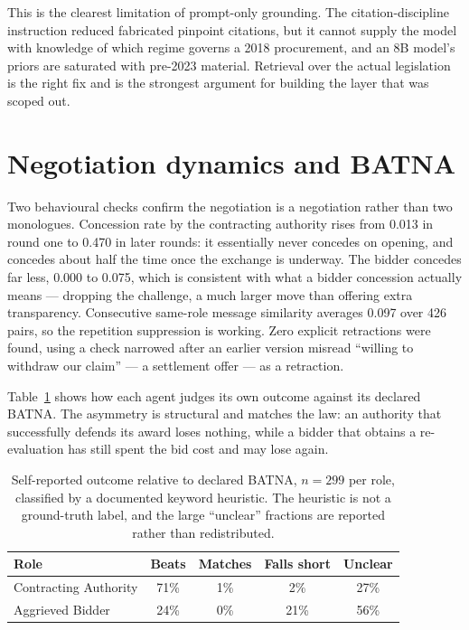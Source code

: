 This is the clearest limitation of prompt-only grounding. The citation-discipline
instruction reduced fabricated pinpoint citations, but it cannot supply the model
with knowledge of which regime governs a 2018 procurement, and an 8B model's
priors are saturated with pre-2023 material. Retrieval over the actual legislation
is the right fix and is the strongest argument for building the layer that was
scoped out.

\section{Negotiation dynamics and BATNA}
\label{sec:dynamics}

Two behavioural checks confirm the negotiation is a negotiation rather than two
monologues. Concession rate by the contracting authority rises from 0.013 in round
one to 0.470 in later rounds: it essentially never concedes on opening, and
concedes about half the time once the exchange is underway. The bidder concedes
far less, 0.000 to 0.075, which is consistent with what a bidder concession
actually means --- dropping the challenge, a much larger move than offering extra
transparency. Consecutive same-role message similarity averages 0.097 over 426
pairs, so the repetition suppression is working. Zero explicit retractions were
found, using a check narrowed after an earlier version misread ``willing to
withdraw our claim'' --- a settlement offer --- as a retraction.

Table~\ref{tab:batna} shows how each agent judges its own outcome against its
declared BATNA. The asymmetry is structural and matches the law: an authority that
successfully defends its award loses nothing, while a bidder that obtains a
re-evaluation has still spent the bid cost and may lose again.

\begin{table}[htbp]
\centering
\footnotesize
\caption[BATNA self-assessment]{Self-reported outcome relative to declared BATNA,
$n=299$ per role, classified by a documented keyword heuristic. The heuristic is
not a ground-truth label, and the large ``unclear'' fractions are reported rather
than redistributed.}
\label{tab:batna}
\begin{tabular}{@{}lcccc@{}}
\toprule
\textbf{Role} & \textbf{Beats} & \textbf{Matches} & \textbf{Falls short} & \textbf{Unclear} \\
\midrule
Contracting Authority & 71\% & 1\% & 2\% & 27\% \\
Aggrieved Bidder & 24\% & 0\% & 21\% & 56\% \\
\bottomrule
\end{tabular}
\end{table}

